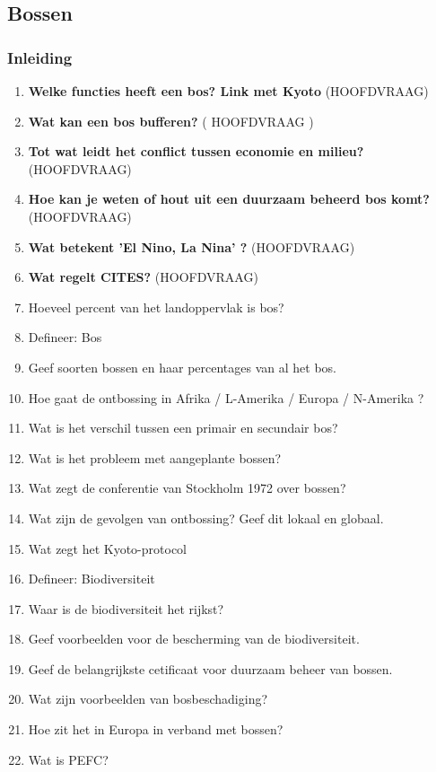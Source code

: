 \documentclass[a4paper,12pt]{article}
\begin{document}
    \subsection{Bossen}
    \subsubsection*{Inleiding}
    \begin{enumerate}
        \item \textbf{Welke functies heeft een bos? Link met Kyoto} (HOOFDVRAAG)
        \item \textbf{Wat kan een bos bufferen?} ( HOOFDVRAAG )
        \item \textbf{Tot wat leidt het conflict tussen economie en milieu?} (HOOFDVRAAG)
        \item \textbf{Hoe kan je weten of hout uit een duurzaam beheerd bos komt?} (HOOFDVRAAG)
        \item \textbf{Wat betekent 'El Nino, La Nina' ?} (HOOFDVRAAG)
        \item \textbf{Wat regelt CITES?} (HOOFDVRAAG)
        \item Hoeveel percent van het landoppervlak is bos?
        \item Defineer: Bos
        \item Geef soorten bossen en haar percentages van al het bos.
        \item Hoe gaat de ontbossing in Afrika / L-Amerika / Europa / N-Amerika ?
        \item Wat is het verschil tussen een primair en secundair bos?
        \item Wat is het probleem met aangeplante bossen?
        \item Wat zegt de conferentie van Stockholm 1972 over bossen?
        \item Wat zijn de gevolgen van ontbossing? Geef dit lokaal en globaal.
        \item Wat zegt het Kyoto-protocol
        \item Defineer: Biodiversiteit
        \item Waar is de biodiversiteit het rijkst?
        \item Geef voorbeelden voor de bescherming van de biodiversiteit.
        \item Geef de belangrijkste cetificaat voor duurzaam beheer van bossen.
        \item Wat zijn voorbeelden van bosbeschadiging?
        \item Hoe zit het in Europa in verband met bossen?
        \item Wat is PEFC?
    \end{enumerate}
\end{document}
